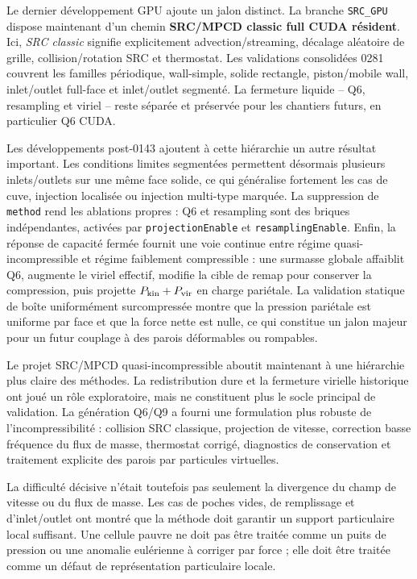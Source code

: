 \documentclass[11pt,a4paper]{article}
\begin{document}
Le dernier développement GPU ajoute un jalon distinct. La branche \texttt{SRC\_GPU} dispose maintenant d'un chemin \textbf{SRC/MPCD classic full CUDA résident}. Ici, \emph{SRC classic} signifie explicitement advection/streaming, décalage aléatoire de grille, collision/rotation SRC et thermostat. Les validations consolidées 0281 couvrent les familles périodique, wall-simple, solide rectangle, piston/mobile wall, inlet/outlet full-face et inlet/outlet segmenté. La fermeture liquide -- Q6, resampling et viriel -- reste séparée et préservée pour les chantiers futurs, en particulier Q6 CUDA.

Les développements post-0143 ajoutent à cette hiérarchie un autre résultat important. Les conditions limites segmentées permettent désormais plusieurs inlets/outlets sur une même face solide, ce qui généralise fortement les cas de cuve, injection localisée ou injection multi-type marquée. La suppression de \texttt{method} rend les ablations propres : Q6 et resampling sont des briques indépendantes, activées par \texttt{projectionEnable} et \texttt{resamplingEnable}. Enfin, la réponse de capacité fermée fournit une voie continue entre régime quasi-incompressible et régime faiblement compressible : une surmasse globale affaiblit Q6, augmente le viriel effectif, modifie la cible de remap pour conserver la compression, puis projette \(P_{\rm kin}+P_{\rm vir}\) en charge pariétale. La validation statique de boîte uniformément surcompressée montre que la pression pariétale est uniforme par face et que la force nette est nulle, ce qui constitue un jalon majeur pour un futur couplage à des parois déformables ou rompables.

Le projet SRC/MPCD quasi-incompressible aboutit maintenant à une hiérarchie plus claire des méthodes. La redistribution dure et la fermeture virielle historique ont joué un rôle exploratoire, mais ne constituent plus le socle principal de validation. La génération Q6/Q9 a fourni une formulation plus robuste de l'incompressibilité : collision SRC classique, projection de vitesse, correction basse fréquence du flux de masse, thermostat corrigé, diagnostics de conservation et traitement explicite des parois par particules virtuelles.

La difficulté décisive n'était toutefois pas seulement la divergence du champ de vitesse ou du flux de masse. Les cas de poches vides, de remplissage et d'inlet/outlet ont montré que la méthode doit garantir un support particulaire local suffisant. Une cellule pauvre ne doit pas être traitée comme un puits de pression ou une anomalie eulérienne à corriger par force ; elle doit être traitée comme un défaut de représentation particulaire locale.
\end{document}
